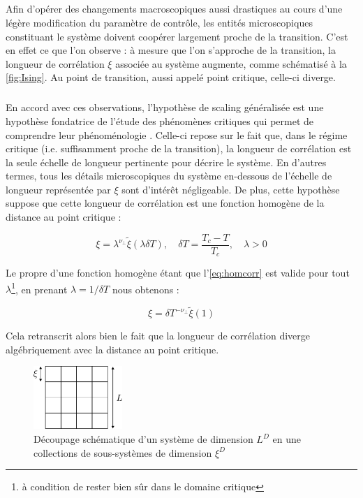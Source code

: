 \subparagraph{}Afin d'opérer des changements macroscopiques aussi drastiques au cours d'une légère modification du paramètre de contrôle, les entités microscopiques constituant le système doivent coopérer largement proche de la transition. C'est en effet ce que l'on observe : à mesure que l'on s'approche de la transition, la longueur de corrélation $\xi$ associée au système augmente, comme schématisé à la \autoref{fig:Ising}. Au point de transition, aussi appelé point critique, celle-ci diverge.

\subparagraph{}En accord avec ces observations, l'hypothèse de scaling généralisée est une hypothèse fondatrice de l'étude des phénomènes critiques qui permet de comprendre leur phénoménologie \cite{kardar_statistical_2007}. Celle-ci repose sur le fait que, dans le régime critique (i.e. suffisamment proche de la transition), la longueur de corrélation est la seule échelle de longueur pertinente pour décrire le système. En d'autres termes, tous les détails microscopiques du système en-dessous de l'échelle de longueur représentée par $\xi$ sont d'intérêt négligeable. De plus, cette hypothèse suppose que cette longueur de corrélation est une fonction homogène de la distance au point critique :

\begin{equation}
    \xi = \lambda^{\nu_\perp} \tilde{\xi}(\lambda \delta T), \quad \delta T = \frac{T_c-T}{T_c}, \quad \lambda>0
    \label{eq:homcorr}
\end{equation}

\noindent Le propre d'une fonction homogène étant  que l'\autoref{eq:homcorr} est valide pour tout $\lambda$\footnote{à condition de rester bien sûr dans le domaine critique}, en prenant $\lambda = 1/\delta T$ nous obtenons :

\begin{equation}
    \xi = \delta T^{-\nu_\perp}\tilde{\xi}(1)
\end{equation}

\noindent Cela retranscrit alors bien le fait que la longueur de corrélation diverge algébriquement avec la distance au point critique.

\begin{figure}[h]
	\centering
	\includegraphics[width=0.3\textwidth]{Chapitre1/Figures/PhenomenesCritiques/decoupageXI.pdf}
	\caption{Découpage schématique d'un système de dimension $L^D$ en une collections de sous-systèmes de dimension $\xi^D$}
	\label{fig:DecoupageXi}
\end{figure}

